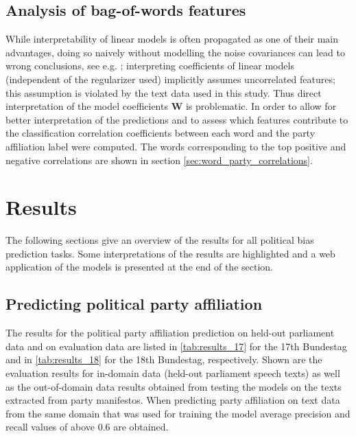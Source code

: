 \documentclass[runningheads,a4paper]{llncs}
\renewcommand{\vec}[1]{\mathbf{#1}}
\begin{document}
\subsection{Analysis of bag-of-words features}\label{sec:correlations_methods}
While interpretability of linear models is often propagated as one of their main advantages, doing so naively without modelling the noise covariances can lead to wrong conclusions, see e.g. \cite{Zien2009, Haufe2013}; interpreting coefficients of linear models (independent of the regularizer used) implicitly assumes uncorrelated features; this assumption is violated by the text data used in this study. Thus direct interpretation of the model coefficients $\vec{W}$ is problematic. In order to allow for better interpretation of the predictions and to assess which features contribute to the classification correlation coefficients between each word and the party affiliation label were computed. The words corresponding to the top positive and negative correlations are shown in section \autoref{sec:word_party_correlations}.

\section{Results}\label{sec:results}

The following sections give an overview of the results for all political bias prediction tasks. Some interpretations of the results are highlighted and a web application of the models is presented at the end of the section.

\subsection{Predicting political party affiliation}
The results for the political party affiliation prediction on held-out parliament data and on evaluation data are listed in \autoref{tab:results_17} for the 17th Bundestag and in \autoref{tab:results_18} for the 18th Bundestag, respectively. 
Shown are the evaluation results for in-domain data (held-out parliament speech texts) as well as the out-of-domain data results obtained from testing the models on the texts extracted from party manifestos. When predicting party affiliation on text data from the same domain that was used for training the model average precision and recall values of above 0.6 are obtained. \\
\end{document}
